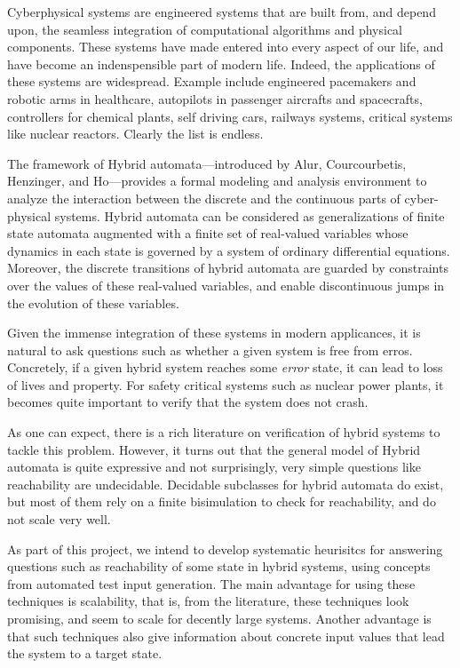 Cyberphysical systems are engineered systems that are built from, 
and depend upon, the seamless integration of computational algorithms and physical components.
These systems have made entered into every aspect of our life, and have become an
indenspensible part of modern life.
Indeed, the applications of these systems are widespread.
Example include engineered pacemakers and robotic arms in healthcare, autopilots in
passenger aircrafts and spacecrafts, controllers for chemical plants,
self driving cars, railways systems, critical systems like
nuclear reactors. Clearly the list is endless.

  The framework of Hybrid automata---introduced by Alur, Courcourbetis,
  Henzinger, and Ho---provides a formal modeling and analysis environment to
  analyze the interaction between the discrete and the continuous parts of
  cyber-physical systems. 
  Hybrid automata can be considered as generalizations of finite state automata
  augmented with a finite set of real-valued variables whose dynamics in each
  state is governed by a system of ordinary differential equations. 
  Moreover, the discrete transitions of hybrid automata are guarded by
  constraints over the values of these real-valued variables, and enable
  discontinuous jumps in the evolution of these variables.
  


Given the immense integration of these systems in modern applicances,
it is natural to ask questions such as whether a given system is free from erros.
Concretely, if a given hybrid system reaches some \emph{error} state, it can lead 
to loss of lives and property. For safety critical systems such as nuclear power plants,
it becomes quite important to verify that the system does not crash. 

As one can expect, there is a rich literature on verification
of hybrid systems to tackle this problem. 
However, it turns out that the  general model of Hybrid automata is quite expressive
and not surprisingly, very simple questions like reachability are undecidable. 
Decidable subclasses for hybrid automata do exist, but most of them rely on a finite bisimulation
to check for reachability, and do not scale very well.

As part of this project, we intend to develop systematic heurisitcs 
for answering  questions such as reachability of some state 
in hybrid systems, using concepts from automated test input generation.
The main advantage for using these techniques is scalability, that is, from
the literature, these techniques look promising, and seem to scale for decently large systems.
Another advantage is that such techniques also give information about
concrete input values that lead the system to a target state.

